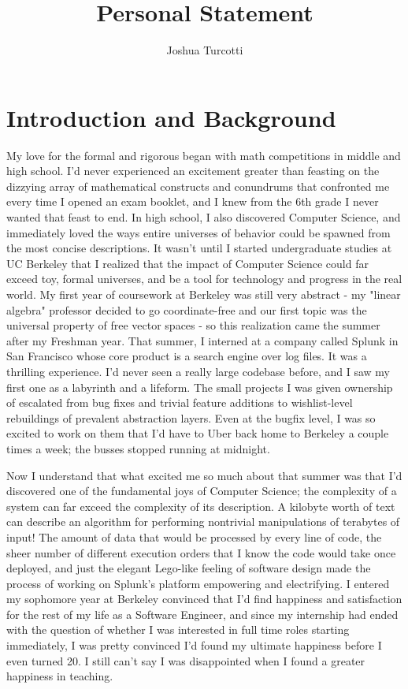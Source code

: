 \documentclass{nsf-grfp}
\title{Personal Statement}
\author{Joshua Turcotti}
\begin{document}
\maketitle

\section*{Introduction and Background}

My love for the formal and rigorous began with math competitions in middle and high school. I'd never experienced an excitement greater than feasting on the dizzying array of mathematical constructs and conundrums that confronted me every time I opened an exam booklet, and I knew from the 6th grade I never wanted that feast to end. In high school, I also discovered Computer Science, and immediately loved the ways entire universes of behavior could be spawned from the most concise descriptions. It wasn't until I started undergraduate studies at UC Berkeley that I realized that the impact of Computer Science could far exceed toy, formal universes, and be a tool for technology and progress in the real world. My first year of coursework at Berkeley was still very abstract - my "linear algebra" professor decided to go coordinate-free and our first topic was the universal property of free vector spaces - so this realization came the summer after my Freshman year. That summer, I interned at a company called Splunk in San Francisco whose core product is a search engine over log files. It was a thrilling experience. I'd never seen a really large codebase before, and I saw my first one as a labyrinth and a lifeform. The small projects I was given ownership of escalated from bug fixes and trivial feature additions to wishlist-level rebuildings of prevalent abstraction layers. Even at the bugfix level, I was so excited to work on them that I'd have to Uber back home to Berkeley a couple times a week; the busses stopped running at midnight. 

Now I understand that what excited me so much about that summer was that I'd discovered one of the fundamental joys of Computer Science; the complexity of a system can far exceed the complexity of its description. A kilobyte worth of text can describe an algorithm for performing nontrivial manipulations of terabytes of input! The amount of data that would be processed by every line of code, the sheer number of different execution orders that I know the code would take once deployed, and just the elegant Lego-like feeling of software design made the process of working on Splunk's platform empowering and electrifying. I entered my sophomore year at Berkeley convinced that I'd find happiness and satisfaction for the rest of my life as a Software Engineer, and since my internship had ended with the question of whether I was interested in full time roles starting immediately, I was pretty convinced I'd found my ultimate happiness before I even turned 20. I still can't say I was disappointed when I found a greater happiness in teaching.
\end{document}
